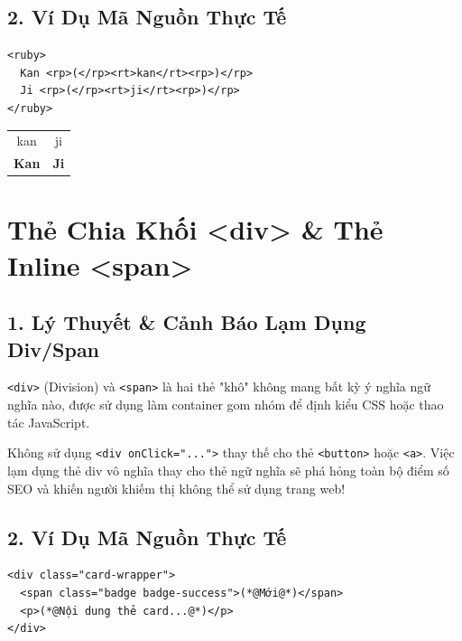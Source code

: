 \documentclass[11pt,oneside]{book}
\newcommand{\codeinline}[1]{\textcolor{accentOrange}{\texttt{#1}}}
\begin{document}
\subsection{2. Ví Dụ Mã Nguồn Thực Tế}
\begin{codeWindow}
\begin{lstlisting}[language=HTML5]
<ruby>
  Kan <rp>(</rp><rt>kan</rt><rp>)</rp>
  Ji <rp>(</rp><rt>ji</rt><rp>)</rp>
</ruby>
\end{lstlisting}
\end{codeWindow}

\begin{browserWindow}
\sffamily\small
\begin{tabular}{c c}
\tiny kan & \tiny ji \\
\bfseries Kan & \bfseries Ji \\
\end{tabular}
\end{browserWindow}

\section{Thẻ Chia Khối <div> \& Thẻ Inline <span>}
\subsection{1. Lý Thuyết \& Cảnh Báo Lạm Dụng Div/Span}
\codeinline{<div>} (Division) và \codeinline{<span>} là hai thẻ "khô" không mang bất kỳ ý nghĩa ngữ nghĩa nào, được sử dụng làm container gom nhóm để định kiểu CSS hoặc thao tác JavaScript.

\begin{warnBox}
Không sử dụng \codeinline{<div onClick="...">} thay thế cho thẻ \codeinline{<button>} hoặc \codeinline{<a>}. Việc lạm dụng thẻ div vô nghĩa thay cho thẻ ngữ nghĩa sẽ phá hỏng toàn bộ điểm số SEO và khiến người khiếm thị không thể sử dụng trang web!
\end{warnBox}

\subsection{2. Ví Dụ Mã Nguồn Thực Tế}
\begin{codeWindow}
\begin{lstlisting}[language=HTML5]
<div class="card-wrapper">
  <span class="badge badge-success">(*@Mới@*)</span>
  <p>(*@Nội dung thẻ card...@*)</p>
</div>
\end{lstlisting}
\end{codeWindow}
\end{document}
